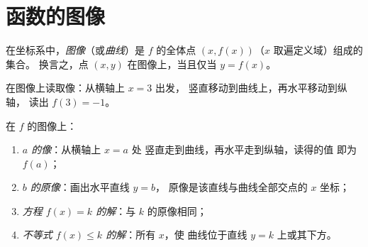 \section{函数的图像}

\begin{definition}[图像]\label{def:g10:functions:graph}
在坐标系中，\emph{图像}（或\emph{曲线}）是
$f$ 的全体点 $(x, f(x))$（$x$ 取遍定义域）组成的集合。
换言之，点 $(x, y)$ 在图像上，当且仅当 $y = f(x)$。
\end{definition}

\begin{omfigure}

{\small 在图像上读取像：从横轴上 $x = 3$ 出发，
竖直移动到曲线上，再水平移动到纵轴，
读出 $f(3) = -1$。}
\end{omfigure}

\begin{method}[读图方法]\label{met:g10:functions:reading}
在 $f$ 的图像上：
\begin{enumerate}
  \item \emph{$a$ 的像}：从横轴上 $x = a$ 处
        竖直走到曲线，再水平走到纵轴，读得的值
        即为 $f(a)$；
  \item \emph{$b$ 的原像}：画出水平直线 $y = b$，
        原像是该直线与曲线全部交点的 $x$
        坐标；
  \item \emph{方程 $f(x) = k$ 的解}：与 $k$ 的原像相同；
  \item \emph{不等式 $f(x) \leq k$ 的解}：所有 $x$，使
        曲线位于直线 $y = k$ 上或其下方。
\end{enumerate}
\end{method}

